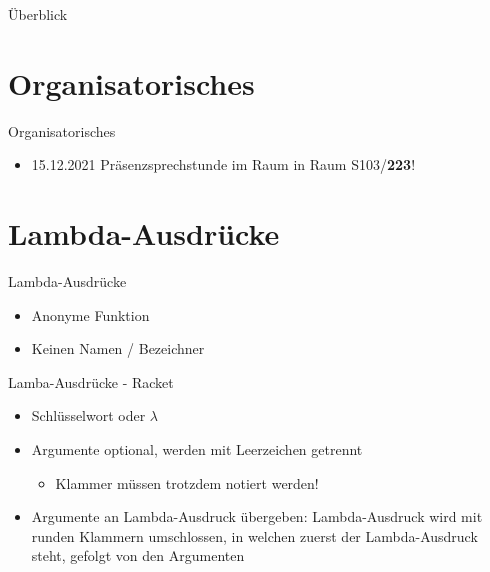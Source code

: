 \documentclass{../tuda-beamer}
\date{08. Dezember 2021}
\begin{document}
  \maketitle

  \begin{frame}{Überblick}
    \tableofcontents
  \end{frame}


  \section{Organisatorisches}
  \begin{frame}{Organisatorisches}
    \begin{itemize}
      \item 15.12.2021 Präsenzsprechstunde im Raum in Raum S103/\textbf{223}!
    \end{itemize}
  \end{frame}


  \section{Lambda-Ausdrücke}
  \begin{frame}{Lambda-Ausdrücke}
    \begin{itemize}
      \item Anonyme Funktion
      \item Keinen Namen / Bezeichner
    \end{itemize}
  \end{frame}

  \begin{frame}{Lamba-Ausdrücke - Racket}
    \begin{itemize}
      \item Schlüsselwort  oder \textcolor{keywordcolor}{\(\lambda\)}
      \item Argumente optional, werden mit Leerzeichen getrennt
      \begin{itemize}
        \item Klammer müssen trotzdem notiert werden!
      \end{itemize}
      \item Argumente an Lambda-Ausdruck übergeben: Lambda-Ausdruck wird mit runden Klammern
      umschlossen, in welchen zuerst der Lambda-Ausdruck steht, gefolgt von den Argumenten
    \end{itemize}
    
  \end{frame}
\end{document}
